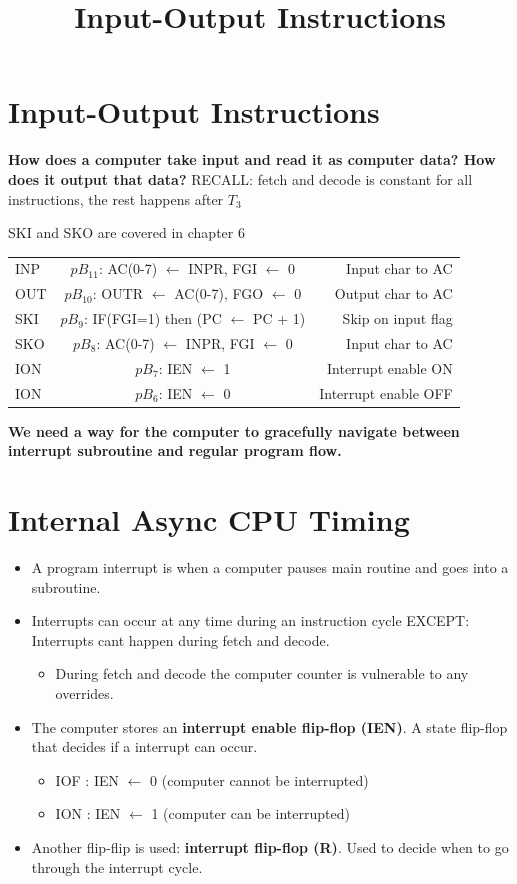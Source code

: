 \documentclass[11pt]{article}
\begin{document}
\title{Input-Output Instructions}

\section{Input-Output Instructions}
\textbf{How does a computer take input and read it as computer data? How does it output that data?\newline}
RECALL: fetch and decode is constant for all instructions, the rest happens after $T_3$

SKI and SKO are covered in chapter 6\newline
\begin{center}  
  \begin{tabular}{l c r}
    INP & $pB_11$: AC(0-7) $\leftarrow$ INPR, FGI $\leftarrow$ 0 & Input char to AC \\
    OUT & $pB_10$: OUTR $\leftarrow$ AC(0-7), FGO $\leftarrow$ 0 & Output char to AC \\
    SKI & $pB_9$: IF(FGI=1) then (PC $\leftarrow$ PC + 1) & Skip on input flag \\
    SKO & $pB_8$: AC(0-7) $\leftarrow$ INPR, FGI $\leftarrow$ 0 & Input char to AC \\
    ION & $pB_7$: IEN $\leftarrow$ 1 & Interrupt enable ON \\
    ION & $pB_6$: IEN $\leftarrow$ 0 & Interrupt enable OFF \\
  \end{tabular}
\end{center}

\textbf{We need a way for the computer to gracefully navigate between interrupt subroutine and regular program flow.}

\section{Internal Async CPU Timing}
\begin{itemize}
  \item A program interrupt is when a computer pauses main routine and goes into a subroutine. 
  \item Interrupts can occur at any time during an instruction cycle EXCEPT: Interrupts cant happen during fetch and decode.
  \begin{itemize}
    \item During fetch and decode the computer counter is vulnerable to any overrides.
  \end{itemize}
  \item The computer stores an \textbf{interrupt enable flip-flop (IEN)}. A state flip-flop that decides if a interrupt can occur.
  \begin{itemize}
    \item IOF : IEN $\leftarrow$ 0 (computer cannot be interrupted)
    \item ION : IEN $\leftarrow$ 1 (computer can be interrupted)
  \end{itemize}
  \item Another flip-flip is used: \textbf{interrupt flip-flop (R)}. Used to decide when to go through the interrupt cycle.
\end{itemize}
\end{document}
